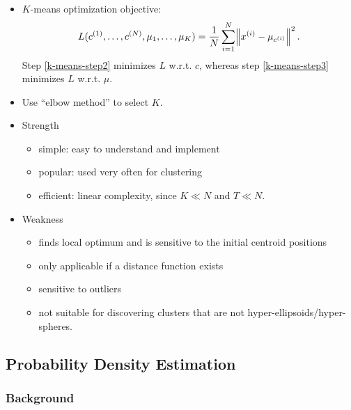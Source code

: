 \documentclass[twocolumn,landscape,10pt]{article}
\theoremstyle{definition}
\begin{document}
\begin{itemize}
    \item $K$-means optimization objective:
        \[
            L(c^{(1)},\ldots,c^{(N)},\mu_1,\ldots,\mu_K)=
            \frac{1}{N}\sum_{i=1}^{N} \norm{x^{(i)}-\mu_{c^{(i)}}}^{2}.
        \]
        Step \ref{k-means-step2} minimizes $L$ w.r.t. $c$, 
        whereas step \ref{k-means-step3} minimizes $L$ w.r.t. $\mu$.
    \item Use ``elbow method'' to select $K$.
    \item Strength
        \begin{itemize}
            \item simple: easy to understand and implement
            \item popular: used very often for clustering
            \item efficient: linear complexity, since $K\ll N$ and $T\ll N$.
        \end{itemize} 
    \item Weakness
        \begin{itemize}
            \item finds local optimum and is sensitive to the initial centroid
                positions
            \item only applicable if a distance function exists
            \item sensitive to outliers
            \item not suitable for discovering clusters that are not
                hyper-ellipsoids/hyper-spheres.
        \end{itemize} 
\end{itemize} 

\subsection{Probability Density Estimation}

\subsubsection{Background}
\end{document}
